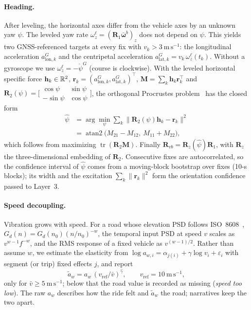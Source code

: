 \paragraph{Heading.}
After leveling, the horizontal axes differ from the vehicle axes by an unknown yaw $\psi$.
The leveled yaw rate $\omega^\ell_z=(\mathbf R_1\bar{\boldsymbol\omega}^b)_z$ does not depend on $\psi$.
This yields two GNSS-referenced targets at every fix with $v_k>3~\mathrm{m\,s^{-1}}$: the longitudinal acceleration $a^G_{\mathrm{lon},k}$ and the centripetal acceleration $a^G_{\mathrm{lat},k}=v_k\,\omega^\ell_z(t_k)$.
Without a gyroscope we use $\omega^\ell_z=-\dot\psi^G$ (course is clockwise).
With the leveled horizontal specific force $\mathbf h_k\in\mathbb{R}^2$, $\mathbf r_k=(a^G_{\mathrm{lon},k},a^G_{\mathrm{lat},k})^\top$, $\mathbf M=\sum_k\mathbf h_k\mathbf r_k^\top$ and $\mathbf R_2(\psi)=\bigl[\begin{smallmatrix}\cos\psi&\sin\psi\\-\sin\psi&\cos\psi\end{smallmatrix}\bigr]$, the orthogonal Procrustes problem~\cite{schonemann1966procrustes} has the closed form
\begin{equation}
\begin{aligned}
\hat\psi&=\arg\min_{\psi}\sum_k\bigl\lVert\mathbf R_2(\psi)\mathbf h_k-\mathbf r_k\bigr\rVert^2\\
&=\operatorname{atan2}\bigl(M_{21}-M_{12},\ M_{11}+M_{22}\bigr),
\end{aligned}
\label{eq:yaw}
\end{equation}
which follows from maximizing $\operatorname{tr}(\mathbf R_2\mathbf M)$.
Finally $\mathbf R_{vb}=\mathbf R_z(\hat\psi)\mathbf R_1$, with $\mathbf R_z$ the three-dimensional embedding of $\mathbf R_2$.
Consecutive fixes are autocorrelated, so the confidence interval of $\hat\psi$ comes from a moving-block bootstrap over fixes (10-s blocks); its width and the excitation $\sum_k\lVert\mathbf r_k\rVert^2$ form the orientation confidence passed to Layer~3.

\paragraph{Speed decoupling.}
Vibration grows with speed.
For a road whose elevation PSD follows ISO~8608~\cite{iso8608}, $G_d(n)=G_d(n_0)(n/n_0)^{-w}$, the temporal input PSD at speed $v$ scales as $v^{w-1}f^{-w}$, and the RMS response of a fixed vehicle as $v^{(w-1)/2}$.
Rather than assume $w$, we estimate the elasticity from $\log a_{w,i}=\alpha_{j(i)}+\gamma\log v_i+\varepsilon_i$ with segment (or trip) fixed effects $j$, and report
\begin{equation}
\tilde a_w=a_w\,(v_{\mathrm{ref}}/\bar v)^{\hat\gamma},\qquad v_{\mathrm{ref}}=10~\mathrm{m\,s^{-1}},
\end{equation}
only for $\bar v\ge5~\mathrm{m\,s^{-1}}$; below that the road value is recorded as missing (\emph{speed too low}).
The raw $a_w$ describes how the ride felt and $\tilde a_w$ the road; narratives keep the two apart.

